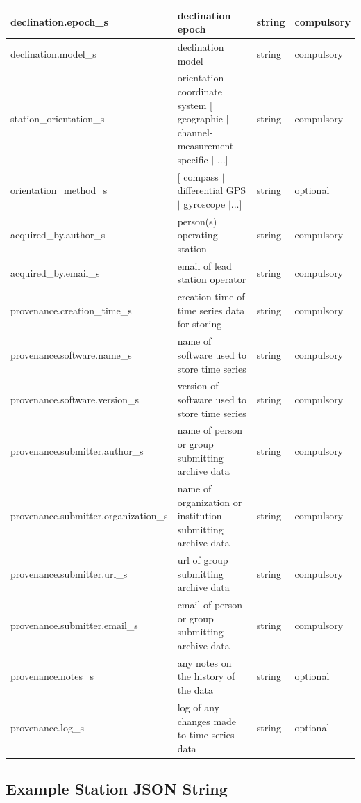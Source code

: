 \documentclass{article}
\begin{document}
\begin{table}[htb!]
\begin{tabular}{|l|p{3in}|l|l|}
		declination.epoch\_s & declination epoch & string & compulsory \\ \hline
		declination.model\_s & declination model & string & compulsory \\ \hline
		station\_orientation\_s & orientation coordinate system [ geographic $|$ channel-measurement specific $|$ ...] & string & compulsory \\ \hline
		orientation\_method\_s & [ compass $|$ differential GPS $|$ gyroscope $|$...] & string & optional \\ \hline
		acquired\_by.author\_s & person(s) operating station & string & compulsory \\ \hline
		acquired\_by.email\_s & email of lead station operator & string & compulsory \\ \hline
		provenance.creation\_time\_s & creation time of time series data for storing & string & compulsory \\ \hline
		provenance.software.name\_s & name of software used to store time series & string & compulsory \\ \hline
		provenance.software.version\_s & version of software used to store time series & string & compulsory \\ \hline
		provenance.submitter.author\_s & name of person or group submitting archive data & string & compulsory \\ \hline
		provenance.submitter.organization\_s & name of organization or institution submitting archive data & string & compulsory \\ \hline
		provenance.submitter.url\_s & url of group submitting archive data & string & compulsory \\ \hline
		provenance.submitter.email\_s & email of person or group submitting archive data & string & compulsory  \\ \hline
		provenance.notes\_s & any notes on the history of the data & string & optional \\ \hline
		provenance.log\_s & log of any changes made to time series data & string & optional \\ \hline
	\end{tabular}
\label{tab:station01}
\end{table}	
   
\newpage
\subsection{Example Station JSON String}
\end{document}
